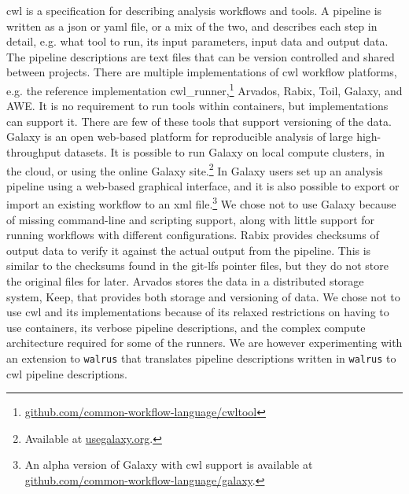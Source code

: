 \gls{cwl} is a specification for describing analysis workflows and
tools.\cite{commonwl} A pipeline is written as a \gls{json} or \gls{yaml} file,
or a mix of the two, and describes each step in detail, e.g. what tool to run,
its input parameters, input data and output data. The pipeline descriptions
are text files that can be version controlled and shared between projects. There
are multiple implementations of \gls{cwl} workflow platforms, e.g. the reference
implementation
cwl\_runner,\footnote{\url{github.com/common-workflow-language/cwltool}}
Arvados,\cite{arvados} Rabix,\cite{rabix} Toil,\cite{toil}
Galaxy,\cite{goecks2010galaxy} and AWE.\cite{awe} It is no requirement to run
tools within containers, but implementations can support it. There are few of
these tools that support versioning of the data.  Galaxy is an open web-based
platform for reproducible analysis of large high-throughput
datasets.\cite{goecks2010galaxy} It is possible to run Galaxy on local compute
clusters, in the cloud, or using the online Galaxy site.\footnote{Available at
\url{usegalaxy.org}.} In Galaxy users set up an analysis pipeline using a
web-based graphical interface, and it is also possible to export or import an
existing workflow to an \gls{xml} file.\footnote{An alpha version of Galaxy
with \gls{cwl} support is available at
\url{github.com/common-workflow-language/galaxy}.}  We chose not to use Galaxy
because of missing command-line and scripting support, along with little support
for running workflows with different
configurations.\cite{spjuth2015experiences} Rabix provides checksums of output
data to verify it against the actual output from the pipeline. This is similar
to the checksums found in the git-lfs pointer files, but they do not store the
original files for later. Arvados stores the data in a distributed storage
system, Keep, that provides both storage and versioning of data. We chose not to
use \gls{cwl} and its implementations because of its relaxed restrictions on
having to use containers, its verbose pipeline descriptions, and the complex
compute architecture required for some of the runners. We are however
experimenting with an extension to \texttt{walrus} that translates pipeline
descriptions written in \texttt{walrus} to \gls{cwl} pipeline descriptions. 

